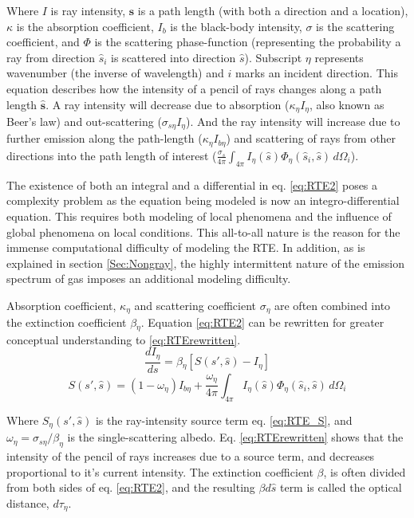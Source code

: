 Where $I$ is ray intensity, $\textbf{s}$ is a path length (with both a direction and a location), $\kappa{}$ is the absorption coefficient, $I_b$ is the black-body intensity, $\sigma{}$ is the scattering coefficient, and $\Phi{}$ is the scattering phase-function (representing the probability a ray from direction $\hat{s}_i$ is scattered into direction $\hat{s}$). Subscript $\eta{}$ represents wavenumber (the inverse of wavelength) and $i$ marks an incident direction. This equation describes how the intensity of a pencil of rays changes along a path length $\hat{\textbf{s}}$. A ray intensity will decrease due to absorption ($\kappa{}_\eta{}I_\eta{}$, also known as Beer's law) and out-scattering ($\sigma{}_{s\eta{}}I_\eta{}$). And the ray intensity will increase due to further emission along the path-length ($\kappa{}_\eta{}I_{b\eta{}}$) and scattering of rays from other directions into the path length of interest ($\frac{\sigma{}_s}{4\pi}\int_{4\pi{}}{I_\eta{}(\hat{s})\Phi_\eta{}(\hat{s}_i,\hat{s})}\,d\Omega{}_i$). 

The existence of both an integral and a differential in eq. \ref{eq:RTE2} poses a complexity problem as the equation being modeled is now an integro-differential equation. 
This requires both modeling of local phenomena and the influence of global phenomena on local conditions. 
This all-to-all nature is the reason for the immense computational difficulty of modeling the RTE. 
In addition, as is explained in section \ref{Sec:Nongray}, the highly intermittent nature of the emission spectrum of gas imposes an additional modeling difficulty.

Absorption coefficient, $\kappa_{\eta{}}$ and scattering coefficient $\sigma{}_\eta{}$ are often combined into the extinction coefficient $\beta{}_\eta{}$. Equation \ref{eq:RTE2} can be rewritten for greater conceptual understanding to \ref{eq:RTErewritten}.
\begin{equation}
    \frac{dI_\eta{}}{ds} = \beta{}_\eta{}[S(s',\hat{s})-I_\eta{}]
    \label{eq:RTErewritten}
\end{equation}
\begin{equation}
    S(s',\hat{s}) = (1-\omega{}_\eta{})I_{b\eta{}}+\frac{\omega{}_\eta{}}{4\pi}\int_{4\pi{}}{I_\eta{}(\hat{s})\Phi_\eta{}(\hat{s}_i,\hat{s})}\,d\Omega{}_i
    \label{eq:RTE_S}
\end{equation}

Where $S_\eta{}(s',\hat{s})$ is the ray-intensity source term eq. \ref{eq:RTE_S}, and $\omega{}_\eta{}=\sigma{}_{s\eta{}}/\beta_{\eta{}}$ is the single-scattering albedo. Eq. \ref{eq:RTErewritten} shows that the intensity of the pencil of rays increases due to a source term, and decreases proportional to it's current intensity.
The extinction coefficient $\beta{}$, is often divided from both sides of eq. \ref{eq:RTE2}, and the resulting $\beta{}d\hat{s}$ term is called the optical distance, $d\tau{}_\eta{}$.

